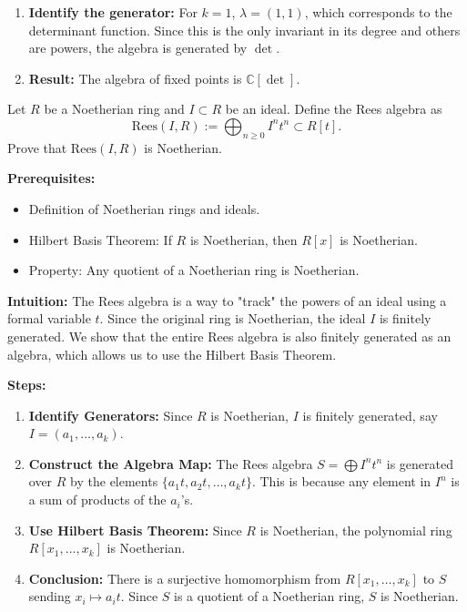 \begin{solution}
\begin{enumerate}
    \item \textbf{Identify the generator:} For $k=1$, $\lambda=(1,1)$, which corresponds to the determinant function. Since this is the only invariant in its degree and others are powers, the algebra is generated by $\det$.

    \item \textbf{Result:} The algebra of fixed points is $\mathbb{C}[\det]$.
\end{enumerate}
\end{solution}

\begin{exercise}
\label{algebra:2019:8}
Let $R$ be a Noetherian ring and $I \subset R$ be an ideal. Define the Rees algebra as
\[\mathrm{Rees}(I, R) := \bigoplus_{n \geq 0} I^n t^n \subset R[t].\]
Prove that $\mathrm{Rees}(I, R)$ is Noetherian.
\end{exercise}

\begin{solution}
\textbf{Prerequisites:}
\begin{itemize}
    \item Definition of Noetherian rings and ideals.
    \item Hilbert Basis Theorem: If $R$ is Noetherian, then $R[x]$ is Noetherian.
    \item Property: Any quotient of a Noetherian ring is Noetherian.
\end{itemize}

\textbf{Intuition:}
The Rees algebra is a way to "track" the powers of an ideal using a formal variable $t$. Since the original ring is Noetherian, the ideal $I$ is finitely generated. We show that the entire Rees algebra is also finitely generated as an algebra, which allows us to use the Hilbert Basis Theorem.

\par

\textbf{Steps:}
\begin{enumerate}
    \item \textbf{Identify Generators:} Since $R$ is Noetherian, $I$ is finitely generated, say $I = (a_1, \dots, a_k)$.

    \item \textbf{Construct the Algebra Map:} The Rees algebra $S = \bigoplus I^n t^n$ is generated over $R$ by the elements $\{a_1 t, a_2 t, \dots, a_k t\}$. This is because any element in $I^n$ is a sum of products of the $a_i$'s.

    \item \textbf{Use Hilbert Basis Theorem:} Since $R$ is Noetherian, the polynomial ring $R[x_1, \dots, x_k]$ is Noetherian.

    \item \textbf{Conclusion:} There is a surjective homomorphism from $R[x_1, \dots, x_k]$ to $S$ sending $x_i \mapsto a_i t$. Since $S$ is a quotient of a Noetherian ring, $S$ is Noetherian.
\end{enumerate}
\end{solution}

